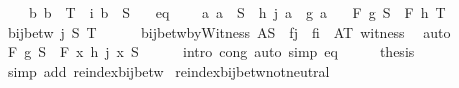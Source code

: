 \begin{isabellebody}
\ \ \ \ {\isachardoublequoteopen}{\isasymAnd}b{\isachardot}{\kern0pt}\ b\ {\isasymin}\ T\ {\isasymLongrightarrow}\ i\ b\ {\isasymin}\ S{\isachardoublequoteclose}\isanewline
\ \ \ eq{\isacharcolon}{\kern0pt}\isanewline
\ \ \ \ {\isachardoublequoteopen}{\isasymAnd}a{\isachardot}{\kern0pt}\ a\ {\isasymin}\ S\ {\isasymLongrightarrow}\ h\ {\isacharparenleft}{\kern0pt}j\ a{\isacharparenright}{\kern0pt}\ {\isacharequal}{\kern0pt}\ g\ a{\isachardoublequoteclose}\isanewline
\ \ \ {\isachardoublequoteopen}F\ g\ S\ {\isacharequal}{\kern0pt}\ F\ h\ T{\isachardoublequoteclose}\isanewline
%
\isadelimproof
%
\endisadelimproof
%
\isatagproof
{}\isamarkupfalse%
\ {\isacharminus}{\kern0pt}\isanewline
\ \ \isamarkupfalse%
\ {\isachardoublequoteopen}bij{\isacharunderscore}{\kern0pt}betw\ j\ S\ T{\isachardoublequoteclose}\isanewline
\ \ \ \ \isamarkupfalse%
\ bij{\isacharunderscore}{\kern0pt}betw{\isacharunderscore}{\kern0pt}byWitness{\isacharbrackleft}{\kern0pt}\ A{\isacharequal}{\kern0pt}S\ \ f{\isacharequal}{\kern0pt}j\ \ f{\isacharprime}{\kern0pt}{\isacharequal}{\kern0pt}i\ \ A{\isacharprime}{\kern0pt}{\isacharequal}{\kern0pt}T{\isacharbrackright}{\kern0pt}\ witness\ \isamarkupfalse%
\ auto\isanewline
\ \ \isamarkupfalse%
\ \isamarkupfalse%
\ {\isachardoublequoteopen}F\ g\ S\ {\isacharequal}{\kern0pt}\ F\ {\isacharparenleft}{\kern0pt}{\isasymlambda}x{\isachardot}{\kern0pt}\ h\ {\isacharparenleft}{\kern0pt}j\ x{\isacharparenright}{\kern0pt}{\isacharparenright}{\kern0pt}\ S{\isachardoublequoteclose}\isanewline
\ \ \ \ \isamarkupfalse%
\ {\isacharparenleft}{\kern0pt}intro\ cong{\isacharparenright}{\kern0pt}\ {\isacharparenleft}{\kern0pt}auto\ simp{\isacharcolon}{\kern0pt}\ eq{\isacharparenright}{\kern0pt}\isanewline
\ \ \isamarkupfalse%
\ \isamarkupfalse%
\ {\isacharquery}{\kern0pt}thesis\isanewline
\ \ \ \ \isamarkupfalse%
\ {\isacharparenleft}{\kern0pt}simp\ add{\isacharcolon}{\kern0pt}\ reindex{\isacharunderscore}{\kern0pt}bij{\isacharunderscore}{\kern0pt}betw{\isacharparenright}{\kern0pt}\isanewline
{}\isamarkupfalse%
%
\endisatagproof
{\isafoldproof}%
%
\isadelimproof
\isanewline
%
\endisadelimproof
\isanewline
{}\isamarkupfalse%
\ reindex{\isacharunderscore}{\kern0pt}bij{\isacharunderscore}{\kern0pt}betw{\isacharunderscore}{\kern0pt}not{\isacharunderscore}{\kern0pt}neutral{\isacharcolon}{\kern0pt}\isanewline

\end{isabellebody}
